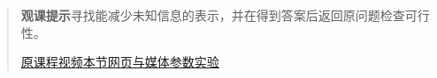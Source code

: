 \begin{quote}\small\textbf{观课提示}\quad 寻找能减少未知信息的表示，并在得到答案后返回原问题检查可行性。

\href{https://www.youtube.com/watch?v=QvuQH4_05LI}{原课程视频}\quad\href{https://vitael04213.github.io/3blue1brown-notes/lessons/ldm-tips-to-problem-solving.html}{本节网页与媒体}\quad\href{https://vitael04213.github.io/3blue1brown-notes/lab.html\#linear}{参数实验}
\end{quote}

